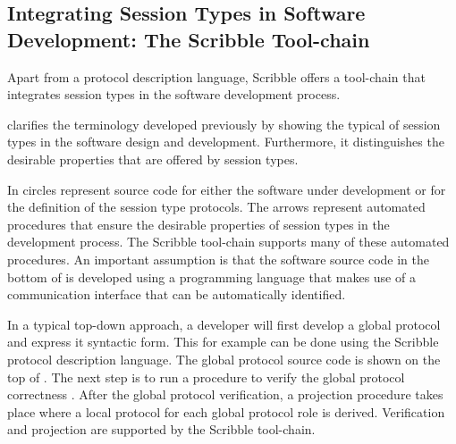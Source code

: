\subsection{Integrating Session Types in Software Development: The Scribble Tool-chain}
\label{sec:sessions_integrate}

Apart from a protocol description language,
Scribble offers a tool-chain that 
integrates session types in the software
development process.





 clarifies the terminology
developed previously by showing the typical
 of session types in the software
design and development. Furthermore, it distinguishes
the desirable properties that are offered by 
session types.

In  circles
represent source code for either the software
under development or for the definition
of the session type protocols. The arrows
represent automated procedures that ensure
the desirable properties of session types
in the development process. The Scribble
tool-chain supports many of these automated
procedures.
An important assumption
is that the software source code in the bottom
of  is developed using 
a programming language that
makes use of a communication interface
that can be automatically identified.

In a typical top-down approach, a developer will first develop a global protocol
and express it syntactic form. This for example can be done
using the Scribble protocol description language.
The global protocol source code is shown
on the top of .
The next step is to run a procedure to verify the 
global protocol correctness .
After the global protocol verification, a projection
procedure takes place where a local protocol
for each global protocol role is derived.
Verification and projection are supported by the Scribble tool-chain.

